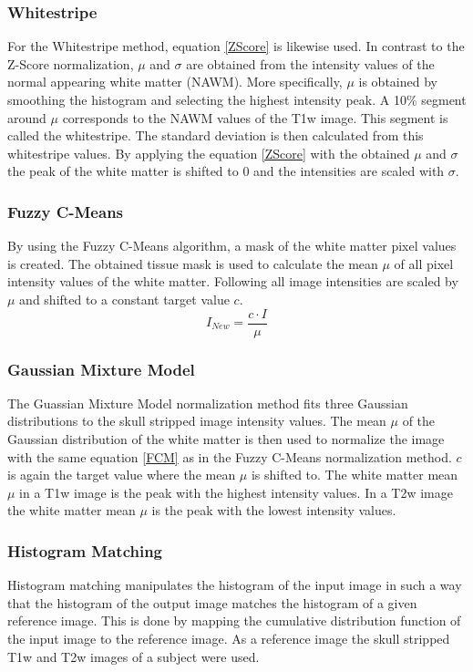 \documentclass[article]{IEEEtran}
\begin{document}
	\subsubsection{Whitestripe}
	For the Whitestripe method, equation \ref{ZScore} is likewise used. In contrast to the Z-Score normalization, $\mu$ and $\sigma$ are obtained from the intensity values of the normal appearing white matter (NAWM). 
	More specifically, $\mu$ is obtained by smoothing the histogram and selecting the highest intensity peak. A 10\% segment around $\mu$ corresponds to the NAWM values of the T1w image. This segment is called the whitestripe.
	The standard deviation is then calculated from this whitestripe values.
	By applying the equation \ref{ZScore} with the obtained $\mu$ and $\sigma$ the peak of the white matter is shifted to 0 and the intensities are scaled with $\sigma$.
	\smallskip
		
	\subsubsection{Fuzzy C-Means}
	By using the Fuzzy C-Means algorithm, a mask of the white matter pixel values is created. 
	The obtained tissue mask is used to calculate the mean $\mu$ of all pixel intensity values of the white matter.
	Following all image intensities are scaled by $\mu$ and shifted to a constant target value $c$.
		\begin{equation}\label{FCM}
			I_{New} = \frac{c \cdot I}{\mu}
		\end{equation}
	
	\subsubsection{Gaussian Mixture Model}
	The Guassian Mixture Model normalization method fits three Gaussian distributions to the skull stripped image intensity values. 
	The mean $\mu$ of the Gaussian distribution of the white matter is then used to normalize the image with the same equation \ref{FCM} as in the Fuzzy C-Means normalization method. 
	$c$ is again the target value where the mean $\mu$ is shifted to. 
	The white matter mean $\mu$ in a T1w image is the peak with the highest intensity values. 
	In a T2w image the white matter mean $\mu$ is the peak with the lowest intensity values. 
	\smallskip

	\subsubsection{Histogram Matching}
	Histogram matching manipulates the histogram of the input image in such a way that the histogram of the output image matches the histogram of a given reference image. 
	This is done by mapping the cumulative distribution function of the input image to the reference image.
	As a reference image the skull stripped T1w and T2w images of a subject were used. 
	\smallskip
	
\end{document}
